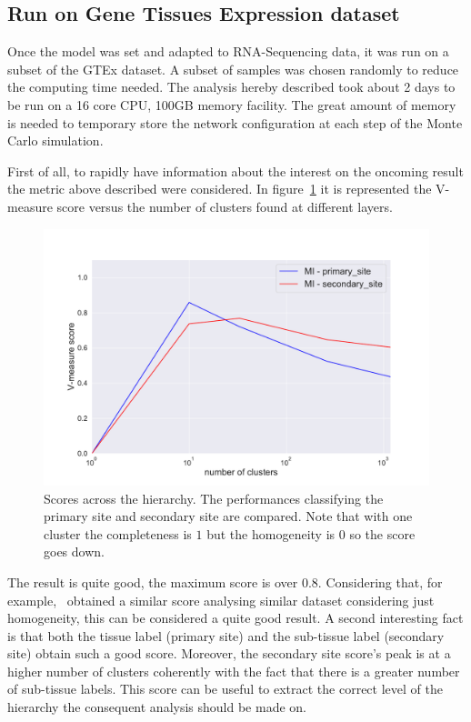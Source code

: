 \subsection{Run on Gene Tissues Expression dataset}
Once the model was set and adapted to RNA-Sequencing data, it was run on a subset of the GTEx dataset. A subset of samples was chosen randomly to reduce the computing time needed. The analysis hereby described took about 2 days to be run on a 16 core CPU, 100GB memory facility. The great amount of memory is needed to temporary store the network configuration at each step of the Monte Carlo simulation.

First of all, to rapidly have information about the interest on the oncoming result the metric above described were considered. In figure~\ref{fig:topic/gtex/oversigma_10tissue/metric_scores} it is represented the V-measure score versus the number of clusters found at different layers.
\begin{figure}[htb!]
    \centering
    \includegraphics[width=0.9\linewidth]{pictures/topic/gtex/oversigma_10tissue/metric_scores.pdf}
    \caption{Scores across the hierarchy. The performances classifying the primary site and secondary site are compared. Note that with one cluster the completeness is $1$ but the homogeneity is $0$ so the score goes down.}
    \label{fig:topic/gtex/oversigma_10tissue/metric_scores}
\end{figure}
The result is quite good, the maximum score is over $0.8$. Considering that, for example,~\cite{Farver2018} obtained a similar score analysing similar dataset considering just homogeneity, this can be considered a quite good result. A second interesting fact is that both the tissue label (primary site) and the sub-tissue label (secondary site) obtain such a good score. Moreover, the secondary site score's peak is at a higher number of clusters coherently with the fact that there is a greater number of sub-tissue labels. This score can be useful to extract the correct level of the hierarchy the consequent analysis should be made on.

